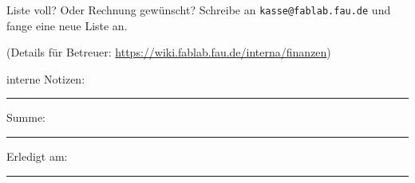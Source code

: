 \documentclass{\basedir fablab-document}
\begin{document}
Liste voll? Oder Rechnung gewünscht? Schreibe an \texttt{kasse@fablab.fau.de} und fange eine neue Liste an.

{\color{gray} \small(Details für Betreuer: \url{https://wiki.fablab.fau.de/interna/finanzen})}

interne Notizen:  \rule{3cm}{0.4pt}\hspace{1cm} Summe:  \rule{2cm}{0.4pt} \hspace{1cm} Erledigt am:  \rule{4cm}{0.4pt} 
\end{document}
